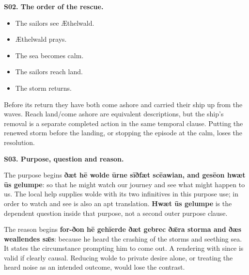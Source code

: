 \par\begin{minipage}{\linewidth}\raggedright
\textbf{S02. The order of the rescue.}

\begin{itemize}
\item The sailors see Æthelwald.
\item Æthelwald prays.
\item The sea becomes calm.
\item The sailors reach land.
\item The storm returns.
\end{itemize}

Before its return they have both come ashore and carried their ship up from the waves. Reach land/\allowbreak{}come ashore are equivalent descriptions, but the ship's removal is a separate completed action in the same temporal clause. Putting the renewed storm before the landing, or stopping the episode at the calm, loses the resolution.

\end{minipage}\par\addvspace{4pt}

\par\begin{minipage}{\linewidth}\raggedright
\textbf{S03. Purpose, question and reason.}

The purpose begins \textbf{ðæt hē wolde ūrne sīðfæt scēawian, and gesēon hwæt ūs gelumpe}: so that he might watch our journey and see what might happen to us. The local help supplies wolde with its two infinitives in this purpose use; in order to watch and see is also an apt translation. \textbf{Hwæt ūs gelumpe} is the dependent question inside that purpose, not a second outer purpose clause.

The reason begins \textbf{for-ðon hē gehīerde ðæt gebrec ðǣra storma and ðæs weallendes sǣs}: because he heard the crashing of the storms and seething sea. It states the circumstance prompting him to come out. A rendering with since is valid if clearly causal. Reducing wolde to private desire alone, or treating the heard noise as an intended outcome, would lose the contrast.

\end{minipage}\par\addvspace{4pt}

